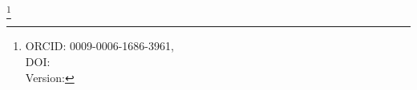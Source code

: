 \documentclass[reprint,aps,onecolumn,nofootinbib]{revtex4-2}
\newcommand{\swirlarrow}{%
    \mathchoice{\mkern-2mu\scriptstyle\boldsymbol{\circlearrowleft}}%
    {\mkern-2mu\scriptstyle\boldsymbol{\circlearrowleft}}%
    {\mkern-2mu\scriptscriptstyle\boldsymbol{\circlearrowleft}}%
    {\mkern-2mu\scriptscriptstyle\boldsymbol{\circlearrowleft}}%
}
\newcommand{\SwirlClock}{S_{(t)}^{\swirlarrow}}
\begin{document}
	\title{\papertitle }
	\author{Omar Iskandarani}
    \thanks{ORCID: 0009-0006-1686-3961,\\
            DOI: \paperdoi \\
            Version: \paperversion
    }
	\date{\today}

\begin{abstract}
We derive long-range gravitational attraction in Swirl--String Theory (SST) as a direct consequence of \emph{chiral swirling knots}---topological vortex filaments such as the trefoil (\(3_1\)), cinquefoil (\(5_1\), (\(5_2\)), and stevedore (\(6_1\)).
Each knot encloses a central rotational line, which acts as an anchor of circulation.
Using Cauchy's integral theorem, we show that the circulation measured around any loop enclosing this axis is quantized by the knot's winding number.
This quantization is expressed by the Swirl Clock \(\SwirlClock\), and its persistence explains why neutral molecules (e.g.\ H\(_2\) attract in otherwise flat space: their knots are connected via the same central swirl line extending beyond the equal-pressure boundary.
\end{abstract}
\maketitle


\end{document}

